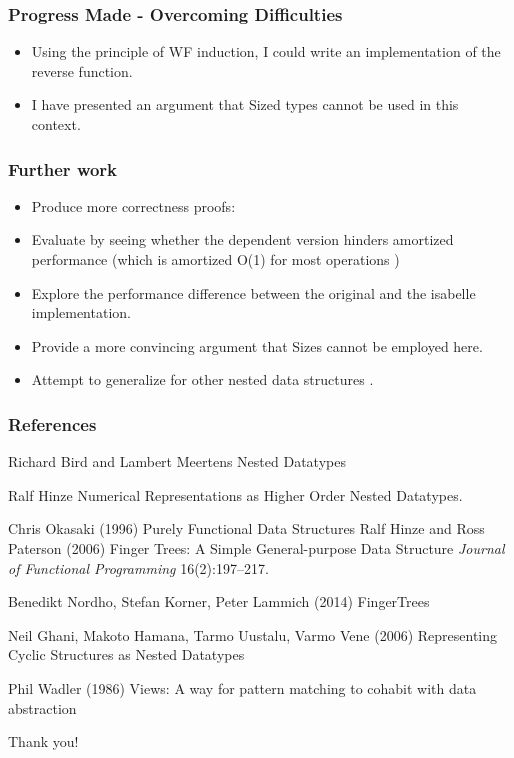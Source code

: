 \documentclass{beamer}
\begin{document}
\begin{frame}
\frametitle{Progress Made - Overcoming Difficulties} 
\begin{itemize}
\item Using the principle of WF induction, I could write an implementation of the reverse function.
\vspace{5mm}
\item I have presented an argument that Sized types cannot be used in this context.
\end{itemize} 
\end{frame}

\begin{frame}
\frametitle{Further work} 
\begin{itemize}
\item Produce more correctness proofs: 
\item Evaluate by seeing whether the dependent version hinders amortized performance (which is amortized O(1) for most operations \cite{okasaki})
\item Explore the performance difference between the original and the isabelle implementation. 
\item Provide a more convincing argument that Sizes cannot be employed here.
\item Attempt to generalize for other nested data structures \cite{numerical}. 
\end{itemize} 
\end{frame} 


\begin{frame}
\frametitle{References}
\footnotesize{
\begin{thebibliography}{99} %
 Richard Bird and Lambert Meertens
\newblock Nested Datatypes 

 Ralf Hinze
\newblock Numerical Representations as Higher Order Nested Datatypes.

 Chris Okasaki (1996)
\newblock Purely Functional Data Structures 
 Ralf Hinze and Ross Paterson (2006)
\newblock Finger Trees: A Simple General-purpose Data Structure
\newblock \emph{Journal of Functional Programming } 16(2):197–217.

 Benedikt Nordho, Stefan Korner, Peter Lammich (2014)
\newblock FingerTrees 

 Neil Ghani, Makoto Hamana, Tarmo Uustalu, Varmo Vene (2006)
\newblock Representing Cyclic Structures as Nested Datatypes  

 Phil Wadler (1986)
\newblock Views: A way for pattern matching to cohabit with data abstraction 





\end{thebibliography}
}
\end{frame}


\begin{frame}
\Huge{\centerline{Thank you!}}
\end{frame}

\end{document}
